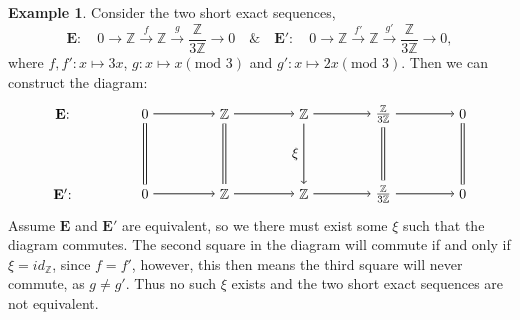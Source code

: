 \documentclass[11.5pt, twoside, a4paper, titlepage]{report}
\providecommand{\bb}[1]{\mathbb{#1}}
\theoremstyle{definition}
\newtheorem{eg}[mydef]{Example}
\theoremstyle{plain}
\begin{document}
\begin{eg}
Consider the two short exact sequences, 
\begin{equation*}
\mathbf{E}: \quad 0\xrightarrow{}\bb{Z}\xrightarrow{f}\bb{Z}\xrightarrow{g}\frac{\bb{Z}}{3\bb{Z}}\xrightarrow{}0  \quad \& \quad \mathbf{E'}: \quad 0\xrightarrow{}\bb{Z}\xrightarrow{f'}\bb{Z}\xrightarrow{g'}\frac{\bb{Z}}{3\bb{Z}}\xrightarrow{}0 ,
\end{equation*}
where $f, f': x\mapsto 3x$, $g: x \mapsto x(\text{mod }3)$ and $g':x\mapsto 2x(\text{mod }3)$. Then we can construct the diagram: 
\begin{equation*}
\begin{tikzpicture}[->,-latex, auto, main path/.style={->, semithick}, main node/.style={}]
\node	[main node]		(1) at (0,0)		{$\mathbf{E}$: \quad };
\node	[main node]		(2) at (2,0)		{$0$};
\node	[main node]		(3) at (4,0)		{$\bb{Z}$};
\node [main node]		(4) at (6,0)		{$\bb{Z}$};
\node [main node]		(5) at (8,0)		{$\frac{\bb{Z}}{3\bb{Z}}$};
\node	[main node]		(11) at (10,0)	{$0$};

\node	[main node]		(6) at (0,-2)		{$\mathbf{E'}$: \quad};
\node	[main node]		(7) at (2,-2)		{$0$};
\node	[main node]		(8) at (4,-2)		{$\bb{Z}$};
\node [main node]		(9) at (6,-2)		{$\bb{Z}$};
\node [main node]		(10) at (8,-2)	{$\frac{\bb{Z}}{3\bb{Z}}$};
\node [main node]		(13) at (10,-2)	{$0$};

\draw (2) edge [main path] node [auto] {$$} (3);
\draw (3) edge [main path] node [auto] {$$} (4);
\draw (4) edge [main path] node [auto] {$$} (5);
\draw (5) edge [main path] (11);


\draw (7) edge [main path] node [auto] {$$} (8);
\draw (8) edge [main path] node [auto] {$$} (9);
\draw (9) edge [main path] node [auto] {$$} (10);
\draw (10) edge [main path] (13);

\draw (3) edge [-, semithick, double, double distance=1.5pt] (8);
\draw (4) edge [main path] node [auto, swap] {$\xi$} (9);
\draw (5) edge [-, semithick, double, double distance=1.5pt](10);
\draw (11) edge [-, semithick, double, double distance=1.5pt] (13);
\draw (2) edge [-, semithick, double, double distance=1.5pt] (7);
\end{tikzpicture}
\end{equation*}
Assume $\mathbf{E}$ and $\mathbf{E'}$ are equivalent, so we there must exist some $\xi$ such that the diagram commutes. The second square in the diagram will commute if and only if $\xi=id_{\bb{Z}}$, since $f=f'$, however, this then means the third square will never commute, as $g\neq g'$. Thus no such $\xi$ exists and the two short exact sequences are not equivalent.
\end{eg}
\end{document}
